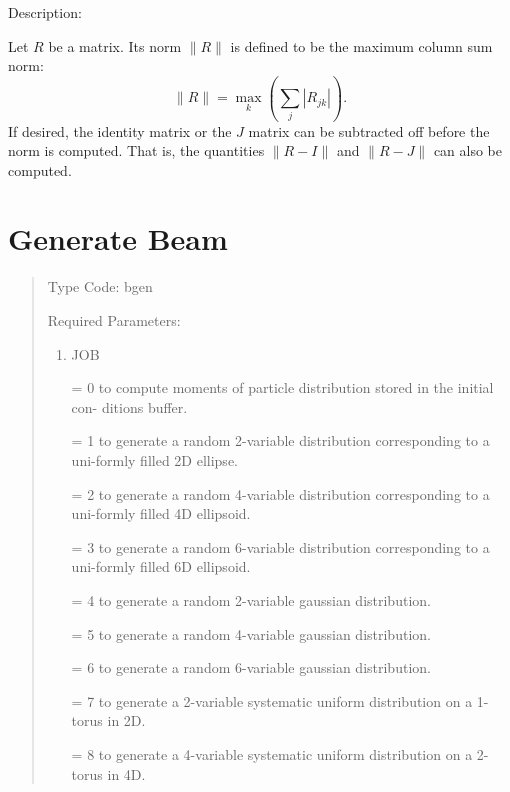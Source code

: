 \vspace{5mm}
Description:
\vspace{2mm}

Let $R$ be a matrix.  Its norm $\parallel R\parallel$ is defined to be the maximum column sum norm:
\[
\parallel R\parallel = \max_k (\sum_j |R_{jk}|).
\]
If desired, the identity matrix or the $J$ matrix can be subtracted off before the norm is computed.  That is, the quantities $\parallel R-I\parallel$ and $\parallel R-J\parallel$ can also be computed.

\newpage
\section{Generate Beam}   
\begin{quotation}
\noindent Type Code:  bgen
\vspace{5mm}

\noindent Required Parameters:
\begin{enumerate}
\item  JOB

       = 0 to compute moments of particle distribution stored in the
initial con- \hspace*{1em}ditions buffer.

       = 1 to generate a random 2-variable distribution corresponding to
	   a uni-\hspace*{1em}formly filled 2D  ellipse.

       = 2 to generate a random 4-variable distribution corresponding to
	   a uni-\hspace*{1em}formly filled 4D  ellipsoid.

       = 3 to generate a random 6-variable distribution corresponding to
	   a uni-\hspace*{1em}formly filled 6D  ellipsoid.

	   = 4 to generate a random 2-variable gaussian distribution.

	   = 5 to generate a random 4-variable gaussian distribution.

	   = 6 to generate a random 6-variable gaussian distribution.

       = 7 to generate a 2-variable systematic uniform distribution on a
1-torus in \hspace*{1em}2D.

       = 8 to generate a 4-variable systematic uniform distribution on a
2-torus in \hspace*{1em}4D.


\end{enumerate}
\end{quotation}
